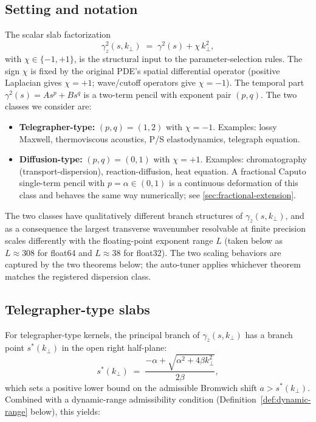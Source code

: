 \documentclass[manuscript,review]{acmart}
\newcommand{\kperp}{k_\perp}
\newcommand{\gammaz}{\gamma_z}
\newcommand{\sigsp}{\chi}
\begin{document}
\subsection{Setting and notation}

The scalar slab factorization
\begin{equation}
\gammaz^2(s, \kperp) \;=\; \gamma^2(s) + \sigsp\,\kperp^2,
\label{eq:factorization}
\end{equation}
with $\sigsp \in \{-1, +1\}$, is the structural input to the
parameter-selection rules. The sign $\sigsp$ is fixed by the
original PDE's spatial differential operator (positive Laplacian
gives $\sigsp = +1$; wave/cutoff operators give $\sigsp = -1$). The
temporal part $\gamma^2(s) = A s^p + B s^q$ is a two-term pencil with
exponent pair $(p, q)$. The two classes we consider are:

\begin{itemize}[leftmargin=*]
\item \textbf{Telegrapher-type:} $(p, q) = (1, 2)$ with
$\sigsp = -1$. Examples: lossy Maxwell, thermoviscous acoustics, P/S
elastodynamics, telegraph equation.
\item \textbf{Diffusion-type:} $(p, q) = (0, 1)$ with $\sigsp = +1$.
Examples: chromatography (transport-dispersion), reaction-diffusion,
heat equation. A fractional Caputo single-term pencil with $p =
\alpha \in (0, 1)$ is a continuous deformation of this class and
behaves the same way numerically; see
\cref{sec:fractional-extension}.
\end{itemize}

The two classes have qualitatively different branch structures of
$\gammaz(s, \kperp)$, and as a consequence the largest transverse
wavenumber resolvable at finite precision scales differently with the
floating-point exponent range $L$ (taken below as $L \approx 308$
for float64 and $L \approx 38$ for float32). The two scaling
behaviors are captured by the two theorems below; the auto-tuner
applies whichever theorem matches the registered dispersion class.

\subsection{Telegrapher-type slabs}\label{sec:hyp-bound}

For telegrapher-type kernels, the principal branch of
$\gammaz(s, \kperp)$ has a branch point $s^*(\kperp)$ in the open
right half-plane:
\begin{equation}
s^*(\kperp) \;=\; \frac{-\alpha + \sqrt{\alpha^2 + 4\beta\kperp^2}}{2\beta},
\label{eq:hyp-branch}
\end{equation}
which sets a positive lower bound on the admissible Bromwich shift
$a > s^*(\kperp)$. Combined with a dynamic-range admissibility
condition (Definition~\ref{def:dynamic-range} below), this yields:
\end{document}
